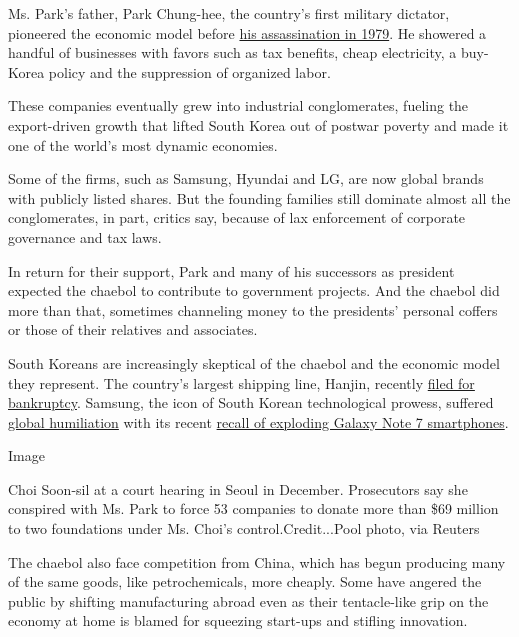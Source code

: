 Ms. Park's father, Park Chung-hee, the country's first military
dictator, pioneered the economic model before
\href{http://www.nytimes3xbfgragh.onion/1979/11/04/archives/huge-crowd-mourns-park-at-funeral-rite-in-seoul.html}{his
assassination in 1979}. He showered a handful of businesses with favors
such as tax benefits, cheap electricity, a buy-Korea policy and the
suppression of organized labor.

These companies eventually grew into industrial conglomerates, fueling
the export-driven growth that lifted South Korea out of postwar poverty
and made it one of the world's most dynamic economies.

Some of the firms, such as Samsung, Hyundai and LG, are now global
brands with publicly listed shares. But the founding families still
dominate almost all the conglomerates, in part, critics say, because of
lax enforcement of corporate governance and tax laws.

In return for their support, Park and many of his successors as
president expected the chaebol to contribute to government projects. And
the chaebol did more than that, sometimes channeling money to the
presidents' personal coffers or those of their relatives and associates.

South Koreans are increasingly skeptical of the chaebol and the economic
model they represent. The country's largest shipping line, Hanjin,
recently
\href{http://www.nytimes3xbfgragh.onion/2016/09/16/business/dealbook/lack-of-planning-hampers-hanjin-shipping-bankruptcy.html}{filed
for bankruptcy}. Samsung, the icon of South Korean technological
prowess, suffered
\href{http://www.nytimes3xbfgragh.onion/2016/10/23/world/asia/galaxy-note-7-recall-south-korea-samsung.html}{global
humiliation} with its recent
\href{http://www.nytimes3xbfgragh.onion/2016/09/03/business/samsung-galaxy-note-battery.html}{recall
of exploding Galaxy Note 7 smartphones}.

Image

Choi Soon-sil at a court hearing in Seoul in December. Prosecutors say
she conspired with Ms. Park to force 53 companies to donate more than
\$69 million to two foundations under Ms. Choi's control.Credit...Pool
photo, via Reuters

The chaebol also face competition from China, which has begun producing
many of the same goods, like petrochemicals, more cheaply. Some have
angered the public by shifting manufacturing abroad even as their
tentacle-like grip on the economy at home is blamed for squeezing
start-ups and stifling innovation.

